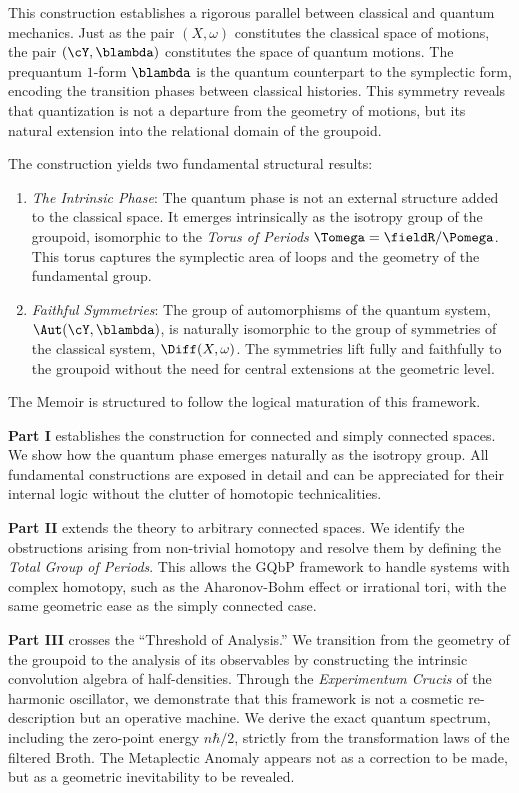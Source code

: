 This construction establishes a rigorous parallel between classical and quantum mechanics.
Just as the pair $(X, \omega)$ constitutes the classical space of motions,
the pair $(\cY, \blambda)$ constitutes the space of quantum motions.
The prequantum $1$-form $\blambda$ is the quantum counterpart to the symplectic form,
encoding the transition phases between classical histories.
This symmetry reveals that quantization is not a departure from the geometry of motions,
but its natural extension into the relational domain of the groupoid.

The construction yields two fundamental structural results:
\begin{enumerate}
  \item \emph{The Intrinsic Phase}:
  The quantum phase is not an external structure added to the classical space.
  It emerges intrinsically as the isotropy group of the groupoid,
  isomorphic to the \emph{Torus of Periods} $\Tomega = \fieldR/\Pomega$.
  This torus captures the symplectic area of loops and the geometry of the fundamental group.
  \item \emph{Faithful Symmetries}:
  The group of automorphisms of the quantum system,
  $\Aut(\cY,\blambda)$,
  is naturally isomorphic to the group of symmetries of the classical system,
  $\Diff(X, \omega)$.
  The symmetries lift fully and faithfully to the groupoid without the need for central extensions at the geometric level.
\end{enumerate}

The Memoir is structured to follow the logical maturation of this framework.

\textbf{Part I} establishes the construction for connected and simply connected spaces.
We show how the quantum phase emerges naturally as the isotropy group.
All fundamental constructions are exposed in detail and can be appreciated for their internal logic without the clutter of homotopic technicalities.

\textbf{Part II} extends the theory to arbitrary connected spaces.
We identify the obstructions arising from non-trivial homotopy and resolve them by defining the \emph{Total Group of Periods}.
This allows the GQbP framework to handle systems with complex homotopy,
such as the Aharonov-Bohm effect or irrational tori,
with the same geometric ease as the simply connected case.

\textbf{Part III} crosses the ``Threshold of Analysis.''
We transition from the geometry of the groupoid to the analysis of its observables by constructing the intrinsic convolution algebra of half-densities.
Through the \emph{Experimentum Crucis} of the harmonic oscillator,
we demonstrate that this framework is not a cosmetic re-description but an operative machine.
We derive the exact quantum spectrum,
including the zero-point energy $n\hbar/2$,
strictly from the transformation laws of the filtered Broth.
The Metaplectic Anomaly appears not as a correction to be made,
but as a geometric inevitability to be revealed.

